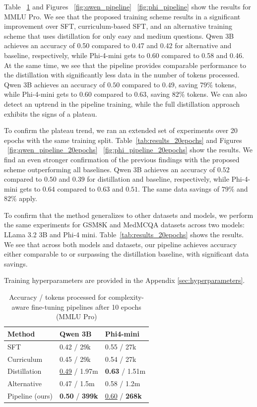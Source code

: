 Table ~\ref{tab:results_10epochs} and Figures ~\ref{fig:qwen_pipeline} ~\ref{fig:phi_pipeline} show the results for MMLU Pro. 
We see that the proposed training scheme results in a significant improvement over SFT, curriculum-based SFT, and an alternative training scheme that uses distillation for only easy and medium questions. 
Qwen 3B achieves an accuracy of 0.50 compared to 0.47 and 0.42 for alternative and baseline, respectively, while Phi-4-mini gets to 0.60 compared to 0.58 and 0.46.
At the same time, we see that the pipeline provides comparable performance to the distillation with significantly less data in the number of tokens processed. 
Qwen 3B achieves an accuracy of $0.50$ compared to $0.49$, saving $79\%$ tokens, while Phi-4-mini gets to $0.60$ compared to $0.63$, saving $82\%$ tokens. 
We can also detect an uptrend in the pipeline training, while the full distillation approach exhibits the signs of a plateau. 

To confirm the plateau trend, we ran an extended set of experiments over 20 epochs with the same training split. Table~\ref{tab:results_20epochs} and Figures ~\ref{fig:qwen_pipeline_20epochs} ~\ref{fig:phi_pipeline_20epochs} show the results. 
We find an even stronger confirmation of the previous findings with the proposed scheme outperforming all baselines. 
Qwen 3B achieves an accuracy of $0.52$ compared to $0.50$ and $0.39$ for distillation and baseline, respectively, while Phi-4-mini gets to $0.64$ compared to $0.63$ and $0.51$. 
The same data savings of $79\%$ and $82\%$ apply.

To confirm that the method generalizes to other datasets and models, we perform the same experiments for GSM8K and MedMCQA datasets across two models: LLama 3.2 3B and Phi-4 mini. Table~\ref{tab:results_20epochs} shows the results.
We see that across both models and datasets, our pipeline achieves accuracy either comparable to or surpassing the distillation baseline, with significant data savings.

Training hyperparameters are provided in the Appendix \ref{sec:hyperparameters}.

\begin{table}[ht]
\centering
\begin{tabular}{l l l}
\hline
Method & Qwen 3B & Phi4-mini \\
\hline
SFT & 0.42 / 29k & 0.55 / 27k \\
Curriculum & 0.45 / 29k & 0.54 / 27k \\
Distillation & \underline{0.49} / 1.97m & \textbf{0.63} / 1.51m \\
Alternative & 0.47 / 1.5m & 0.58 / 1.2m  \\
Pipeline (ours) & \textbf{0.50} / \textbf{399k} & \underline{0.60} / \textbf{268k}  \\
\hline
\end{tabular}
\caption{Accuracy / tokens processed for complexity-aware fine-tuning pipelines after 10 epochs (MMLU Pro)}
\label{tab:results_10epochs}
\end{table}

